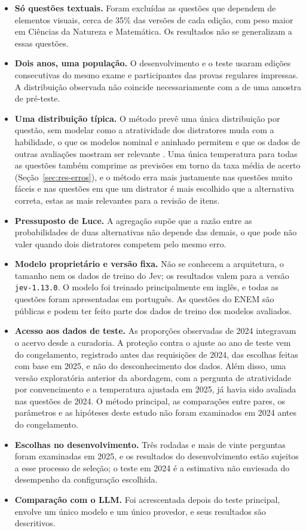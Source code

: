 \begin{itemize}[leftmargin=*]
  \item \textbf{Só questões textuais.} Foram excluídas as questões que dependem de elementos visuais, cerca de 35\% das versões de cada edição, com peso maior em Ciências da Natureza e Matemática. Os resultados não se generalizam a essas questões.
  \item \textbf{Dois anos, uma população.} O desenvolvimento e o teste usaram edições consecutivas do mesmo exame e participantes das provas regulares impressas. A distribuição observada não coincide necessariamente com a de uma amostra de pré-teste.
  \item \textbf{Uma distribuição típica.} O método prevê uma única distribuição por questão, sem modelar como a atratividade dos distratores muda com a habilidade, o que os modelos nominal e aninhado permitem e que os dados de outras avaliações mostram ser relevante \citep{bock1972,haberman2019}. Uma única temperatura para todas as questões também comprime as previsões em torno da taxa média de acerto (Seção~\ref{sec:res-erros}), e o método erra mais justamente nas questões muito fáceis e nas questões em que um distrator é mais escolhido que a alternativa correta, estas as mais relevantes para a revisão de itens.
  \item \textbf{Pressuposto de Luce.} A agregação supõe que a razão entre as probabilidades de duas alternativas não depende das demais, o que pode não valer quando dois distratores competem pelo mesmo erro.
  \item \textbf{Modelo proprietário e versão fixa.} Não se conhecem a arquitetura, o tamanho nem os dados de treino do Jev; os resultados valem para a versão \texttt{jev-1.13.0}. O modelo foi treinado principalmente em inglês, e todas as questões foram apresentadas em português. As questões do ENEM são públicas e podem ter feito parte dos dados de treino dos modelos avaliados.
  \item \textbf{Acesso aos dados de teste.} As proporções observadas de 2024 integravam o acervo desde a curadoria. A proteção contra o ajuste ao ano de teste vem do congelamento, registrado antes das requisições de 2024, das escolhas feitas com base em 2025, e não do desconhecimento dos dados. Além disso, uma versão exploratória anterior da abordagem, com a pergunta de atratividade por convencimento e a temperatura ajustada em 2025, já havia sido avaliada nas questões de 2024. O método principal, as comparações entre pares, os parâmetros e as hipóteses deste estudo não foram examinados em 2024 antes do congelamento.
  \item \textbf{Escolhas no desenvolvimento.} Três rodadas e mais de vinte perguntas foram examinadas em 2025, e os resultados do desenvolvimento estão sujeitos a esse processo de seleção; o teste em 2024 é a estimativa não enviesada do desempenho da configuração escolhida.
  \item \textbf{Comparação com o LLM.} Foi acrescentada depois do teste principal, envolve um único modelo e um único provedor, e seus resultados são descritivos.
\end{itemize}
